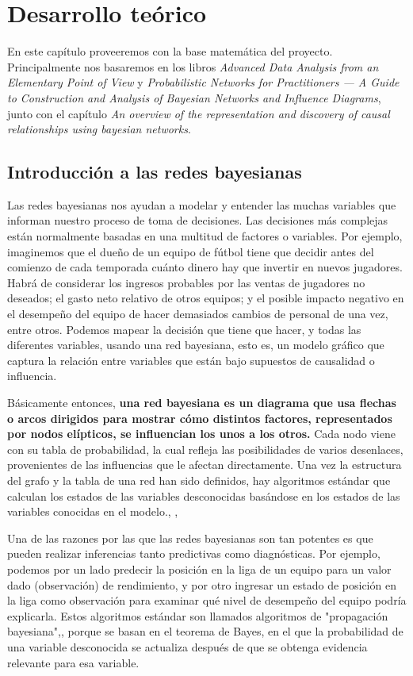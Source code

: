 \chapter{Desarrollo teórico}
En este capítulo proveeremos con la base matemática del proyecto. Principalmente nos basaremos en los libros \textit{Advanced Data Analysis
from an Elementary Point of View}\cite{ada} y \textit{Probabilistic Networks for Practitioners — A
Guide to Construction and Analysis of Bayesian
Networks and Influence Diagrams}\cite{pgm}, junto con el capítulo \textit{An overview of the representation and 
discovery of causal relationships using bayesian networks}\cite{cooper}.

\section{Introducción a las redes bayesianas}
Las redes bayesianas nos ayudan a modelar y entender las muchas variables que informan nuestro proceso de 
toma de decisiones. Las decisiones más complejas están normalmente basadas en una multitud de factores o 
variables. Por ejemplo, imaginemos que el dueño de un equipo de fútbol tiene que decidir antes del comienzo 
de cada temporada cuánto dinero hay que invertir en nuevos jugadores. Habrá de considerar los ingresos 
probables por las ventas de jugadores no deseados; el gasto neto relativo de otros
equipos; y el posible impacto negativo en el desempeño del equipo de hacer demasiados cambios de personal de una 
vez, entre otros. Podemos mapear la decisión que tiene que hacer, y todas las diferentes variables, usando 
una red bayesiana, esto es, un modelo gráfico que captura la relación entre variables que están bajo 
supuestos de causalidad o influencia.\cite{things-to-know-BN}

Básicamente entonces, \textbf{una red bayesiana es un diagrama que 
usa flechas o arcos dirigidos para mostrar cómo distintos factores, representados por nodos elípticos, se 
influencian los unos a los otros.} Cada nodo viene con su tabla de probabilidad, la cual refleja las 
posibilidades de varios desenlaces, provenientes de las influencias que le afectan directamente. Una vez 
la estructura del grafo y la tabla de una red han sido definidos, hay algoritmos estándar que 
calculan los estados de las variables desconocidas basándose en los estados de las variables conocidas en el
modelo.\cite{learning-algorithms-BN-comparison}, \cite{BN-achilles-heel}, \cite{different-algorithmic-schemes}

Una de las razones por las que las redes bayesianas son tan potentes es que pueden realizar inferencias 
tanto predictivas como diagnósticas. Por ejemplo, podemos por un lado predecir la posición en la liga de un equipo para 
un valor dado (observación) de rendimiento, y por otro ingresar un estado de posición en la 
liga como observación para examinar qué nivel de desempeño del equipo podría explicarla. Estos algoritmos estándar son
llamados algoritmos de "propagación bayesiana"\cite{Cano2004},\cite{more-algorithms}, \cite{back-prop} porque se basan en el teorema de Bayes, en el que la 
probabilidad de una variable desconocida se actualiza después de que se obtenga evidencia relevante para esa variable.\cite{prop-alg}

